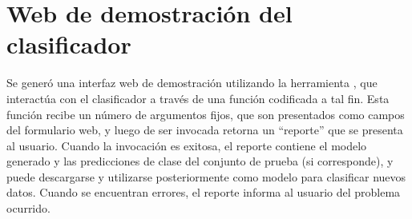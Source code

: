 %
%
\section{Web de demostración del clasificador}
%
Se generó una interfaz web de demostración utilizando la herramienta
\eng{\webdemo{}} \cite{webdemobuilder}, que interactúa con el
clasificador a través de una función codificada a tal fin.
Esta función recibe un número de argumentos fijos, que son presentados
como campos del formulario web, y luego de ser invocada retorna un
``reporte'' que se presenta al usuario.
Cuando la invocación es exitosa, el reporte contiene el modelo
generado y las predicciones de clase del conjunto de prueba (si
corresponde), y puede descargarse y utilizarse posteriormente como
modelo para clasificar nuevos datos.
Cuando se encuentran errores, el reporte informa al usuario del
problema ocurrido.

